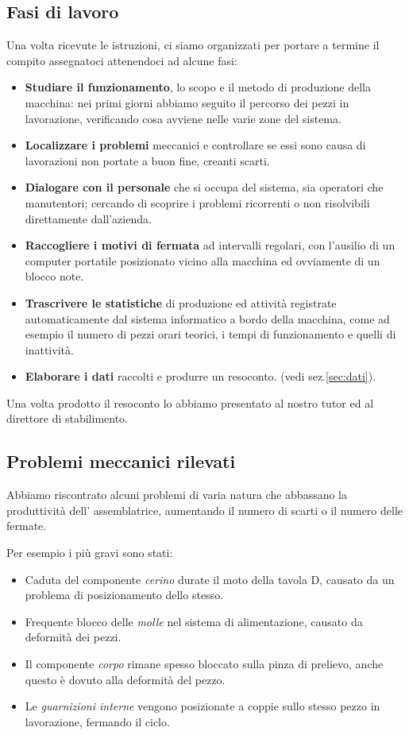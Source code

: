 \documentclass[a4paper,14pt,twoside]{extarticle} %
\begin{document}
\subsection{Fasi di lavoro}
Una volta ricevute le istruzioni, ci siamo organizzati per portare a termine il compito assegnatoci attenendoci ad alcune fasi:
\begin{itemize}

\item{\textbf{Studiare il funzionamento}, lo scopo e il metodo di produzione della macchina: 
nei primi giorni abbiamo seguito il percorso dei pezzi in lavorazione, verificando cosa avviene nelle varie zone del sistema.}
\item{\textbf{Localizzare i problemi} meccanici e controllare se essi sono causa di lavorazioni non portate a buon fine, creanti scarti.}
\item{\textbf{Dialogare con il personale} che si occupa del sistema, sia operatori che manutentori; cercando di scoprire i problemi ricorrenti o non risolvibili direttamente dall'azienda.}
\item{\textbf{Raccogliere i motivi di fermata} ad intervalli regolari, con l'ausilio di un computer portatile posizionato vicino alla macchina ed ovviamente di un blocco note.}
\item{\textbf{Trascrivere le statistiche} di produzione ed attività registrate automaticamente dal sistema informatico a bordo della macchina, come ad esempio il numero di pezzi orari teorici, i tempi di funzionamento e quelli di inattività.}
\item{\textbf{Elaborare i dati} raccolti e produrre un resoconto. (vedi sez.\ref{sec:dati}).}
\end{itemize}

Una volta prodotto il resoconto lo abbiamo presentato al nostro tutor ed al direttore di stabilimento.
\newpage
\subsection{Problemi meccanici rilevati}\label{sec:prob}
Abbiamo riscontrato alcuni problemi di varia natura che abbassano la produttività dell' assemblatrice, aumentando il numero di scarti o il numero delle fermate.

Per esempio i più gravi sono stati:
\begin{itemize}
\item{Caduta del componente \emph{cerino} durate il moto della tavola D, causato da un problema di posizionamento dello stesso.}
\item{Frequente blocco delle \emph{molle} nel sistema di alimentazione, causato da deformità dei pezzi.}
\item{Il componente \emph{corpo} rimane spesso bloccato sulla pinza di prelievo, anche questo è dovuto alla deformità del pezzo.}
\item{Le \emph{guarnizioni interne} vengono posizionate a coppie sullo stesso pezzo in lavorazione, fermando il ciclo.}
\end{itemize}
\end{document}
